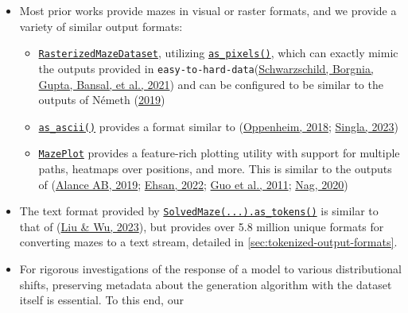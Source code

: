 \documentclass[10pt,a4paper,onecolumn]{article}
\providecommand{\tightlist}{%
  \setlength{\itemsep}{0pt}\setlength{\parskip}{0pt}}
\begin{document}
\begin{itemize}
\item
  Most prior works provide mazes in visual or raster formats, and we
  provide a variety of similar output formats:

  \begin{itemize}
  \tightlist
  \item
    \href{https://understanding-search.github.io/maze-dataset/maze_dataset/dataset/rasterized.html\#RasterizedMazeDataset}{\texttt{RasterizedMazeDataset}},
    utilizing
    \href{https://understanding-search.github.io/maze-dataset/maze_dataset.html\#LatticeMaze.as_pixels}{\texttt{as\_pixels()}},
    which can exactly mimic the outputs provided in
    \texttt{easy-to-hard-data}(\protect\hyperlink{ref-easy_to_hard}{Schwarzschild,
    Borgnia, Gupta, Bansal, et al., 2021}) and can be configured to be
    similar to the outputs of Németh
    (\protect\hyperlink{ref-gh_Nemeth_2019}{2019})
  \item
    \href{https://understanding-search.github.io/maze-dataset/maze_dataset.html\#LatticeMaze.as_ascii}{\texttt{as\_ascii()}}
    provides a format similar to
    (\protect\hyperlink{ref-gh-oppenheimj2018maze}{Oppenheim, 2018};
    \protect\hyperlink{ref-eval-gpt-visual}{Singla, 2023})
  \item
    \href{https://understanding-search.github.io/maze-dataset/maze_dataset/plotting.html\#MazePlot}{\texttt{MazePlot}}
    provides a feature-rich plotting utility with support for multiple
    paths, heatmaps over positions, and more. This is similar to the
    outputs of (\protect\hyperlink{ref-mazegenerator-net}{Alance AB,
    2019}; \protect\hyperlink{ref-gh_Ehsan_2022}{Ehsan, 2022};
    \protect\hyperlink{ref-mathematica-maze}{Guo et al., 2011};
    \protect\hyperlink{ref-mdl-suite}{Nag, 2020})
  \end{itemize}
\item
  The text format provided by
  \href{https://understanding-search.github.io/maze-dataset/maze_dataset.html\#MazeDataset.as_tokens}{\texttt{SolvedMaze(...).as\_tokens()}}
  is similar to that of (\protect\hyperlink{ref-eval-LLM-graphs}{Liu \&
  Wu, 2023}), but provides over 5.8 million unique formats for
  converting mazes to a text stream, detailed in
  \autoref{sec:tokenized-output-formats}.
\item
  For rigorous investigations of the response of a model to various
  distributional shifts, preserving metadata about the generation
  algorithm with the dataset itself is essential. To this end, our

\end{itemize}
\end{document}
